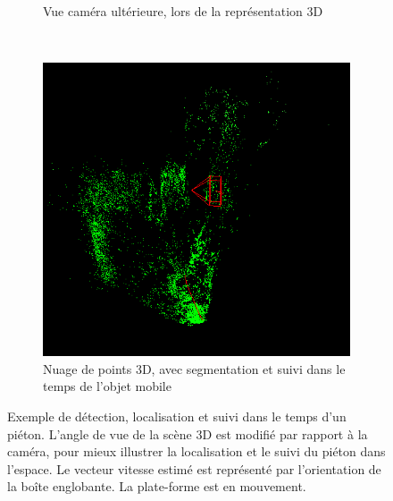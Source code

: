 \begin{figure}
\begin{center}
\begin{subfigure}[t]{0.40\textwidth}
			\caption{Vue caméra ultérieure, lors de la représentation 3D}
			\label{fig:ch5_tracking_exemple_2_2}
		\end{subfigure}	
		~
		\begin{subfigure}{0.48\textwidth}
			\includegraphics[width=\textwidth]{Chapter5/graphics/NewCollege_3D_1_2.png} 
			\caption{Nuage de points 3D, avec segmentation et suivi dans le temps de l'objet mobile}
		\end{subfigure}	
		
		\caption{Exemple de détection, localisation et suivi dans le temps d'un piéton. L'angle de vue de la scène 3D est modifié par rapport à la caméra, pour mieux illustrer la localisation et le suivi du piéton dans l'espace. Le vecteur vitesse estimé est représenté par l'orientation de la boîte englobante. La plate-forme est en mouvement.}
		\label{fig:ch5_tracking_exemple_2}
	\end{center}
\end{figure}

